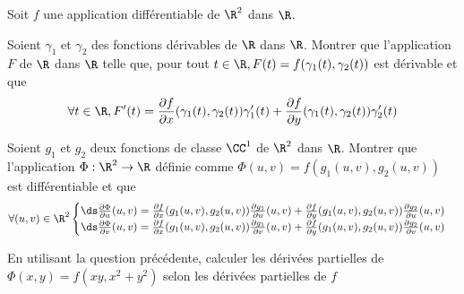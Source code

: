 \documentclass{report}
\begin{document}
\begin{exo}
    Soit \(f\) une application différentiable de \(\R^2\) dans \(\R\).
    \begin{q}{1}
        Soient \(\gamma_1\) et \(\gamma_2\) des fonctions dérivables de \(\R\)
        dans \(\R\). Montrer que l'application \(F\) de \(\R\) dans \(\R\) telle
        que, pour tout \(t\in\R, F(t)=f(\gamma_1(t), \gamma_2(t))\) est dérivable
        et que \[\forall t\in\R, F'(t)=
        \frac{\partial f}{\partial x}(\gamma_1(t), \gamma_2(t))\gamma_1'(t) +
        \frac{\partial f}{\partial y}(\gamma_1(t), \gamma_2(t))\gamma_2'(t)\]
        \boxans{
            \[
                F' = \frac{\partial f}{\partial \gamma_1}+\frac{\partial f}{\partial \gamma_2}
                = \frac{\partial \gamma_1}{\partial t}\frac{\partial f}{\partial x}
                + \frac{\partial \gamma_2}{\partial t}\frac{\partial f}{\partial y}
            \]
        }
    \end{q}
    \begin{q}{2}
        Soient \(g_1\) et \(g_2\) deux fonctions de classe \(\CC^1\) de \(\R^2\)
        dans \(\R\). Montrer que l'application \(\Phi:\R^2\to\R\) définie comme
        \(\Phi(u,v)=f(g_1(u,v),g_2(u,v))\) est différentiable et que
        \[\forall (u,v)\in\R^2 \begin{cases}
        \ds\frac{\partial\Phi}{\partial u}(u,v)=\frac{\partial f}{\partial x}(
            g_1(u,v),g_2(u,v))\frac{\partial g_1}{\partial u}(u,v)
            +\frac{\partial f}{\partial y}(
            g_1(u,v),g_2(u,v))\frac{\partial g_2}{\partial u}(u,v)
        \\
        \ds\frac{\partial\Phi}{\partial v}(u,v)=\frac{\partial f}{\partial x}(
            g_1(u,v),g_2(u,v))\frac{\partial g_1}{\partial v}(u,v)
            +\frac{\partial f}{\partial y}(
            g_1(u,v),g_2(u,v))\frac{\partial g_2}{\partial v}(u,v)
        \end{cases}\]
        \boxans{
            \[
                \frac{\partial\Phi}{\partial u}= \frac{\partial f}{\partial g_1|_v}
                + \frac{\partial f}{\partial g_2|_v} =
                \frac{\partial g_1}{\partial u}\frac{\partial f}{\partial x}
                +\frac{\partial g_2}{\partial u}\frac{\partial f}{\partial y}
            \]
        }
    \end{q}
    \begin{q}{3}
        En utilisant la question précédente, calculer les dérivées partielles de
        \(\Phi(x,y)=f(xy, x^2+y^2)\) selon les dérivées partielles de \(f\)
        \boxans{
            \[
                \frac{\partial\Phi}{\partial x}(x,y)=
                y\frac{\partial f}{\partial x}(xy, x^2+y^2) +
                2x\frac{\partial f}{\partial y}(xy, x^2+y^2)
                \quad\quad \frac{\partial\Phi}{\partial x}(x,y) =
                \frac{\partial\Phi}{\partial y}(y,x)
            \]
        }
    \end{q}
\end{exo}
\end{document}
